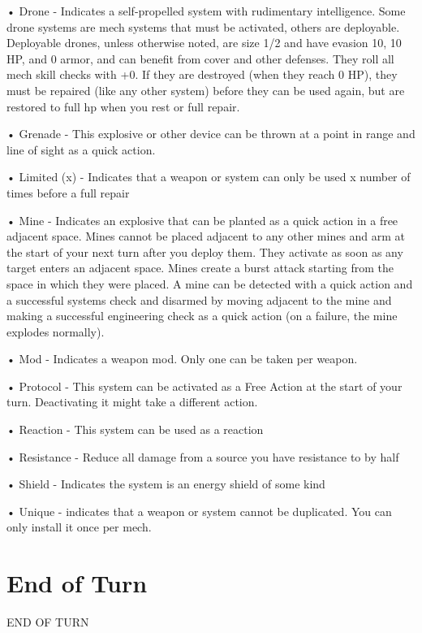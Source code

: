 •  \hypertarget{Drone}{Drone} - Indicates a self-propelled system with rudimentary intelligence. Some drone systems
  are mech systems that must be activated, others are deployable. Deployable drones, unless
  otherwise noted, are size 1/2 and have evasion 10, 10 HP, and 0 armor, and can benefit from
  cover and other defenses. They roll all mech skill checks with +0. If they are destroyed (when
  they reach 0 HP), they must be repaired (like any other system) before they can be used again,
  but are restored to full hp when you rest or full repair.

•  \hypertarget{Grenade}{Grenade} - This explosive or other device can be thrown at a point in range and line of sight as
  a quick action.

•  \hypertarget{Limited}{Limited (x)} - Indicates that a weapon or system can only be used x number of times before a
  full repair

•  \hypertarget{Mine}{Mine} - Indicates an explosive that can be planted as a quick action in a free adjacent space.
  Mines cannot be placed adjacent to any other mines and arm at the start of your next turn after
  you deploy them. They activate as soon as any target enters an adjacent space. Mines create a
  burst attack starting from the space in which they were placed. A mine can be detected with a
  quick action and a successful systems check and disarmed by moving adjacent to the mine
  and making a successful engineering check as a quick action (on a failure, the mine explodes
  normally).

•  Mod - Indicates a weapon mod. Only one can be taken per weapon.

•  \hypertarget{Protocol}{Protocol} - This system can be activated as a Free Action at the start of your turn. Deactivating
  it might take a different action.

•  \hypertarget{Reaction}{Reaction} - This system can be used as a reaction

•  \hypertarget{Resistance}{Resistance} - Reduce all damage from a source you have resistance to by half

•  \hypertarget{Shield}{Shield} - Indicates the system is an energy shield of some kind

•  \hypertarget{Unique}{Unique} - indicates that a weapon or system cannot be duplicated. You can only install it once
  per mech.

\section{End of Turn}
\hypertarget{End of Turn}{END OF TURN}

